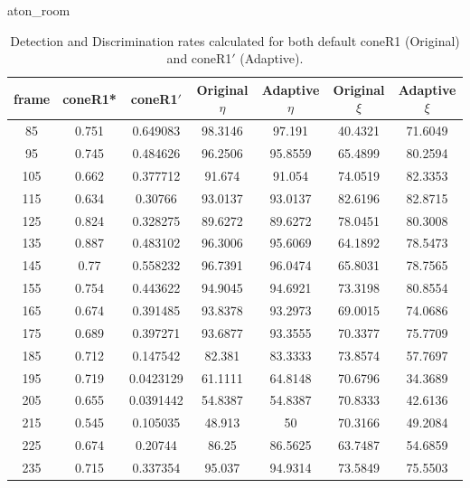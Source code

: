 \begin{appendices}
\begin{table}
\begin{tabular}{ |c|c|c|c|c|c|c| }
\end{tabular}

\end{table}

\begin{table}
\centering
\caption{aton\_room}
\caption*{Detection and Discrimination rates calculated for both default coneR1 (Original) and coneR1$'$ (Adaptive).}
\begin{tabular}{ |c|c|c|c|c|c|c| }
\hline
\textbf{frame} &  \textbf{coneR1*} &  \textbf{coneR1$'$} &  \textbf{Original $\eta$} &  \textbf{Adaptive $\eta$} &  \textbf{Original $\xi$} &  \textbf{Adaptive $\xi$} \\
\hline
\hline
85 &  0.751 &  0.649083 &  98.3146 &  97.191 &  40.4321 &  71.6049 \\
\hline
95 &  0.745 &  0.484626 &  96.2506 &  95.8559 &  65.4899 &  80.2594 \\
\hline
105 &  0.662 &  0.377712 &  91.674 &  91.054 &  74.0519 &  82.3353 \\
\hline
115 &  0.634 &  0.30766 &  93.0137 &  93.0137 &  82.6196 &  82.8715 \\
\hline
125 &  0.824 &  0.328275 &  89.6272 &  89.6272 &  78.0451 &  80.3008 \\
\hline
135 &  0.887 &  0.483102 &  96.3006 &  95.6069 &  64.1892 &  78.5473 \\
\hline
145 &  0.77 &  0.558232 &  96.7391 &  96.0474 &  65.8031 &  78.7565 \\
\hline
155 &  0.754 &  0.443622 &  94.9045 &  94.6921 &  73.3198 &  80.8554 \\
\hline
165 &  0.674 &  0.391485 &  93.8378 &  93.2973 &  69.0015 &  74.0686 \\
\hline
175 &  0.689 &  0.397271 &  93.6877 &  93.3555 &  70.3377 &  75.7709 \\
\hline
185 &  0.712 &  0.147542 &  82.381 &  83.3333 &  73.8574 &  57.7697 \\
\hline
195 &  0.719 &  0.0423129 &  61.1111 &  64.8148 &  70.6796 &  34.3689 \\
\hline
205 &  0.655 &  0.0391442 &  54.8387 &  54.8387 &  70.8333 &  42.6136 \\
\hline
215 &  0.545 &  0.105035 &  48.913 &  50 &  70.3166 &  49.2084 \\
\hline
225 &  0.674 &  0.20744 &  86.25 &  86.5625 &  63.7487 &  54.6859 \\
\hline
235 &  0.715 &  0.337354 &  95.037 &  94.9314 &  73.5849 &  75.5503 \\

\end{tabular}
\end{table}
\end{appendices}
